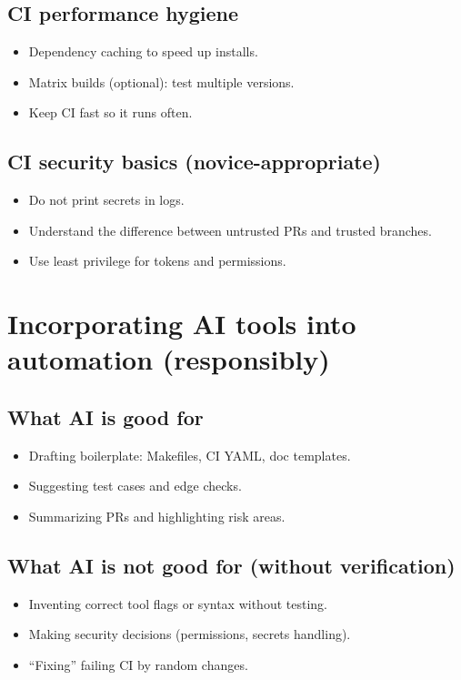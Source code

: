 \subsection{CI performance hygiene}
\begin{itemize}
\item Dependency caching to speed up installs.
\item Matrix builds (optional): test multiple versions.
\item Keep CI fast so it runs often.
\end{itemize}

\subsection{CI security basics (novice-appropriate)}
\begin{itemize}
\item Do not print secrets in logs.
\item Understand the difference between untrusted PRs and trusted branches.
\item Use least privilege for tokens and permissions.
\end{itemize}

\section{Incorporating AI tools into automation (responsibly)}
\subsection{What AI is good for}
\begin{itemize}
\item Drafting boilerplate: Makefiles, CI YAML, doc templates.
\item Suggesting test cases and edge checks.
\item Summarizing PRs and highlighting risk areas.
\end{itemize}

\subsection{What AI is not good for (without verification)}
\begin{itemize}
\item Inventing correct tool flags or syntax without testing.
\item Making security decisions (permissions, secrets handling).
\item ``Fixing'' failing CI by random changes.
\end{itemize}

